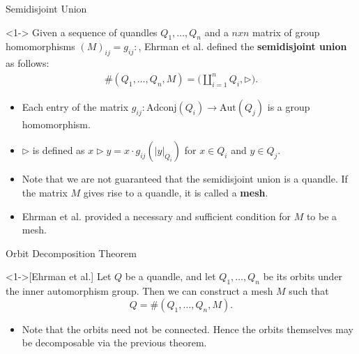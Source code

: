\documentclass[10pt]{beamer}
\newcommand{\Aut}{\mathrm{Aut}} %
\newcommand{\thru}{\rhd} %
\newcommand{\Adconj}{\mathrm{Adconj}} %
\theoremstyle{plain}
\begin{document}
\begin{frame}{Semidisjoint Union}
\begin{definition}[Ehrman et al.]<1->
Given a sequence of quandles $Q_1, \dots , Q_n$ and a $nxn$ matrix of group homomorphisms $(M)_{ij} = g_{ij} : $, Ehrman et al. \cite{EGTY2008} defined the \textbf{semidisjoint union} as follows:
\begin{align*}
    \#(Q_1, \dots, Q_n, M) = \Big(\coprod_{i = 1}^nQ_i, \thru\Big).
\end{align*}
\end{definition}
\pause
\begin{itemize}
    \item Each entry of the matrix $g_{ij}:\Adconj (Q_i)\to \Aut(Q_j)$ is a group homomorphism. 
    
    \item $\thru$ is defined as $x\thru y = x\cdot g_{ij}(|y|_{Q_i})$ for $x\in Q_i$ and $y\in Q_j$.
    
    \item Note that we are not guaranteed that the semidisjoint union is a quandle. If the matrix $M$ gives rise to a quandle, it is called a \textbf{mesh}.
    \item Ehrman et al. provided a necessary and sufficient condition for $M$ to be a mesh.
\end{itemize}

\end{frame}

\begin{frame}{Orbit Decomposition Theorem}

\begin{theorem}<1->[Ehrman et al.]
Let $Q$ be a quandle, and let $Q_1,\dots, Q_n$ be its orbits under the inner automorphism group. Then we can construct a mesh $M$ such that 
\[Q = \#(Q_1, \dots, Q_n, M).\]
\end{theorem}
\vspace{0.15in}
\begin{itemize}
  
    \item<2-> Note that the orbits need not be connected. Hence the orbits themselves may be decomposable via the previous theorem. 

\end{itemize}

    
\end{frame}
\end{document}
